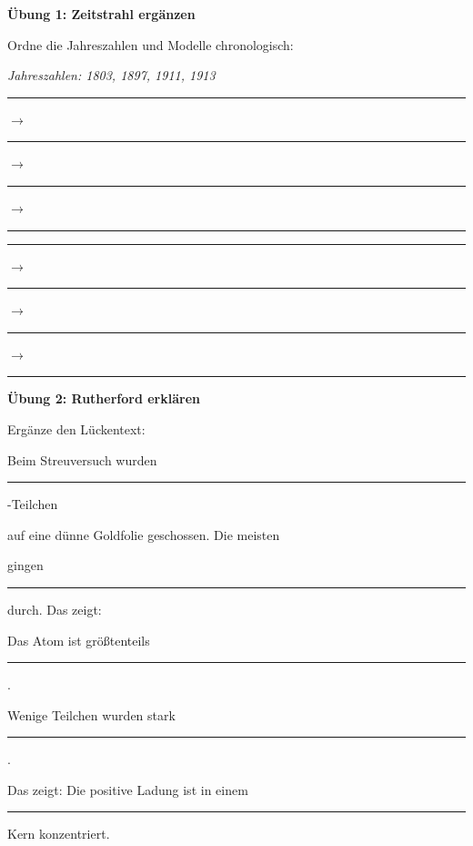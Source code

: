 \documentclass[10pt, a4paper]{article}
\newcommand{\fachfarbe}{physik}
\newcommand{\luecke}[1]{\rule{#1}{0.4pt}}
\newcommand{\abschnitt}[1]{%
    \vspace{8pt}
    \noindent\textbf{\textcolor{\fachfarbe}{#1}}
    \vspace{4pt}
}
\begin{document}
\begin{multicols}{2}

\columnbreak


\abschnitt{Übung 1: Zeitstrahl ergänzen}

Ordne die Jahreszahlen und Modelle chronologisch:

\vspace{4pt}

\textit{Jahreszahlen: 1803, 1897, 1911, 1913}

\vspace{6pt}

\begin{center}
\luecke{1.2cm} $\rightarrow$ \luecke{1.2cm} $\rightarrow$ \luecke{1.2cm} $\rightarrow$ \luecke{1.2cm}

\vspace{4pt}

\luecke{1.5cm} $\rightarrow$ \luecke{1.5cm} $\rightarrow$ \luecke{1.5cm} $\rightarrow$ \luecke{1.5cm}
\end{center}

\vspace{6pt}


\abschnitt{Übung 2: Rutherford erklären}

Ergänze den Lückentext:

\vspace{4pt}

Beim Streuversuch wurden \luecke{1.5cm}-Teilchen

auf eine dünne Goldfolie geschossen. Die meisten

gingen \luecke{2cm} durch. Das zeigt:

Das Atom ist größtenteils \luecke{2cm}.

Wenige Teilchen wurden stark \luecke{1.8cm}.

Das zeigt: Die positive Ladung ist in einem

\luecke{2cm} Kern konzentriert.

\vspace{8pt}



\end{multicols}
\end{document}

